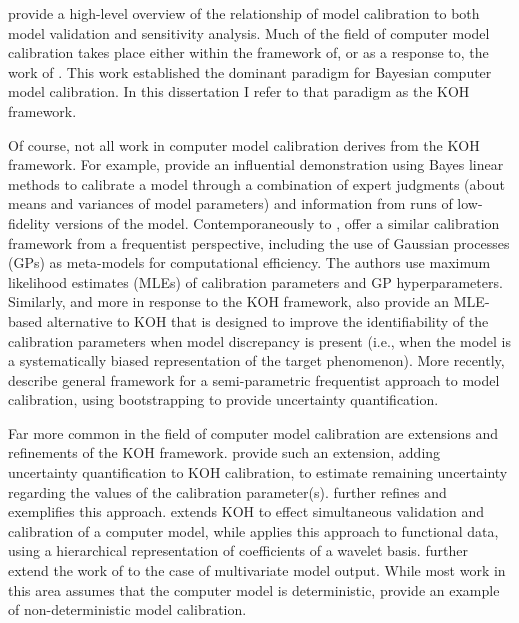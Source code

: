 \documentclass[10pt,a4paper]{article}
\begin{document}

\citet{Trucano2006} provide a high-level overview of the relationship of model calibration to both model validation and sensitivity analysis.
Much of the field of computer model calibration takes place either within the framework of, or as a response to, the work of \citet{Kennedy2001}.
This work established the dominant paradigm for Bayesian computer model calibration.
In this dissertation I refer to that paradigm as the KOH framework.

Of course, not all work in computer model calibration derives from the KOH framework.
For example, \citet{Craig1997} provide an influential demonstration using Bayes linear methods to calibrate a model through a combination of expert judgments (about means and variances of model parameters) and information from runs of low-fidelity versions of the model.
Contemporaneously to \citet{Kennedy2001}, \citet{Cox2001} offer a similar calibration framework from a frequentist perspective, including the use of Gaussian processes (GPs) as meta-models for computational efficiency. 
The authors use maximum likelihood estimates (MLEs) of calibration parameters and GP hyperparameters.
Similarly, and more in response to the KOH framework, \citet{Loeppky2006} also provide an MLE-based alternative to KOH that is designed to improve the identifiability of the calibration parameters when model discrepancy is present (i.e., when the model is a systematically biased representation of the target phenomenon).
More recently, \citet{Wong2014} describe general framework for a semi-parametric frequentist approach to model calibration, using bootstrapping to provide uncertainty quantification.

Far more common in the field of computer model calibration are extensions and refinements of the KOH framework.
\citet{Higdon2004} provide such an extension, adding uncertainty quantification to KOH calibration, to estimate remaining uncertainty regarding the values of the calibration parameter(s).
\citet{Williams2006} further refines and exemplifies this approach.
\citet{Bayarri2007a} extends KOH to effect simultaneous validation and calibration of a computer model, while \citet{Bayarri2007b} applies this approach to functional data, using a hierarchical representation of coefficients of a wavelet basis.
\citet{Paulo2012} further extend the work of \citet{Bayarri2007a} to the case of multivariate model output.
While most work in this area assumes that the computer model is deterministic, \citet{Pratola2018} provide an example of non-deterministic model calibration.
\end{document}
